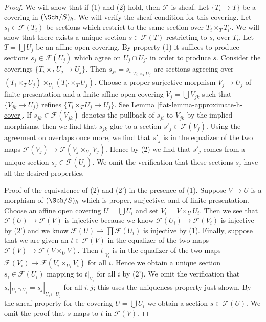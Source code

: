 \begin{proof}

We will show that if (1) and (2) hold, then $\mathcal{F}$ is sheaf.
Let $\{T_i \to T\}$ be a covering in $(\Sch/S)_h$.
We will verify the sheaf condition for this covering.
Let $s_i \in \mathcal{F}(T_i)$ be sections which restrict to the same
section over $T_i \times_T T_{i'}$. We will show that there exists a
unique section $s \in \mathcal{F}(T)$ restricting to $s_i$ over $T_i$.
Let $T = \bigcup U_j$ be an affine open covering.
By property (1) it suffices to produce sections $s_j \in \mathcal{F}(U_j)$
which agree on $U_j \cap U_{j'}$ in order to produce $s$.
Consider the coverings $\{T_i \times_T U_j \to U_j\}$.
Then $s_{ji} = s_i|_{T_i \times_T U_j}$ are sections agreeing
over $(T_i \times_T U_j) \times_{U_j} (T_{i'} \times_T U_j)$.
Choose a proper surjective morphism $V_j \to U_j$ of finite presentation
and a finite affine open covering $V_j = \bigcup V_{jk}$
such that $\{V_{jk} \to U_j\}$ refines $\{T_i \times_T U_j \to U_j\}$.
See Lemma \ref{flat-lemma-approximate-h-cover}.
If $s_{jk} \in \mathcal{F}(V_{jk})$
denotes the pullback of $s_{ji}$ to $V_{jk}$ by the
implied morphisms, then we find that $s_{jk}$ glue to a section
$s'_j \in \mathcal{F}(V_j)$. Using the agreement on overlaps
once more, we find that $s'_j$ is in the equalizer of the two
maps $\mathcal{F}(V_j) \to \mathcal{F}(V_j \times_{U_j} V_j)$.
Hence by (2) we find that $s'_j$ comes from a unique section
$s_j \in \mathcal{F}(U_j)$. We omit the verification that these
sections $s_j$ have all the desired properties.

\medskip\noindent
Proof of the equivalence of (2) and (2') in the presence of (1).
Suppose $V \to U$ is a morphism of $(\Sch/S)_h$ which is
proper, surjective, and of finite presentation. Choose an
affine open covering $U = \bigcup U_i$ and set $V_i = V \times_U U_i$.
Then we see that $\mathcal{F}(U) \to \mathcal{F}(V)$
is injective because we know $\mathcal{F}(U_i) \to \mathcal{F}(V_i)$
is injective by (2') and we know $\mathcal{F}(U) \to \prod \mathcal{F}(U_i)$
is injective by (1). Finally, suppose that we are given an
$t \in \mathcal{F}(V)$ in the equalizer of the two maps
$\mathcal{F}(V) \to \mathcal{F}(V \times_U V)$.
Then $t|_{V_i}$ is in the equalizer of the two maps
$\mathcal{F}(V_i) \to \mathcal{F}(V_i \times_{U_i} V_i)$
for all $i$. Hence we obtain a unique section $s_i \in \mathcal{F}(U_i)$
mapping to $t|_{V_i}$ for all $i$ by (2').
We omit the verification that $s_i|_{U_i \cap U_j} = s_j|_{U_i \cap U_j}$
for all $i, j$; this uses the uniqueness property just shown.
By the sheaf property for the covering $U = \bigcup U_i$ we obtain
a section $s \in \mathcal{F}(U)$. We omit the proof that $s$
maps to $t$ in $\mathcal{F}(V)$.
\end{proof}


